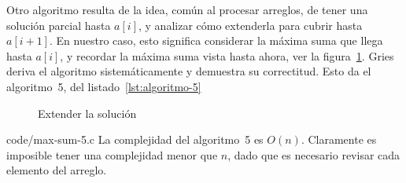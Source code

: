   Otro algoritmo resulta de la idea,
  común al procesar arreglos,
  de tener una solución parcial hasta \(a[i]\),
  y analizar cómo extenderla para cubrir hasta \(a[i + 1]\).
  En nuestro caso,
  esto significa considerar la máxima suma que llega hasta \(a[i]\),
  y recordar la máxima suma vista hasta ahora,
  ver la figura~\ref{fig:Algoritmo-5}.
  Gries~%
    \cite{gries82:_note_strategy_loop_inv}
  deriva el algoritmo sistemáticamente
  y demuestra su correctitud.
  Esto da el algoritmo~5,
  del listado~\ref{lst:algoritmo-5}
  \begin{figure}[ht]
    \centering
    \caption{Extender la solución}
    \label{fig:Algoritmo-5}
  \end{figure}

  
                  {code/max-sum-5.c}
  La complejidad del algoritmo~5 es \(O(n)\).
  Claramente es imposible tener una complejidad menor que \(n\),
  dado que es necesario revisar cada elemento del arreglo.

